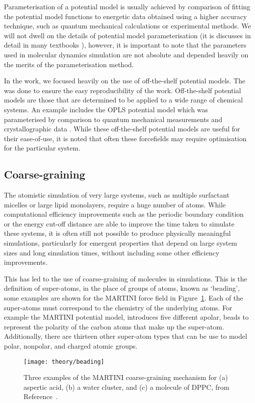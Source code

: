 Parameterisation of a potential model is usually achieved by comparison of fitting the potential model functions to energetic data obtained using a higher accuracy technique, such as quantum mechanical calculations or experimental methods.
We will not dwell on the details of potential model parameterisation (it is discusses in detail in many textbooks \cite{harvey_computational_2018,leach_molecular_1996}), however, it is important to note that the parameters used in molecular dynamics simulation are not absolute and depended heavily on the merits of the parameterisation method.

In the work, we focused heavily on the use of off-the-shelf potential models.
The was done to ensure the easy reproducibility of the work.
Off-the-shelf potential models are those that are determined to be applied to a wide range of chemical systems.
An example includes the OPLS potential model which was parameterised by comparison to quantum mechanical measurements and crystallographic data \cite{jorgensen_opls_1988}.
While these off-the-shelf potential models are useful for their ease-of-use, it is noted that often these forcefields may require optimisation for the particular system.

\subsection{Coarse-graining}
\label{sec:coarsegraining}
The atomistic simulation of very large systems, such as multiple surfactant micelles or large lipid monolayers, require a huge number of atoms.
While computational efficiency improvements such as the periodic boundary condition or the energy cut-off distance are able to improve the time taken to simulate these systems, it is often still not possible to produce physically meaningful simulations, particularly for emergent properties that depend on large system sizes and long simulation times, without including some other efficiency improvements.

This has led to the use of coarse-graining of molecules in simulations.
This is the definition of super-atoms, in the place of groups of atoms, known as `beading', some examples are shown for the MARTINI force field \cite{marrink_martini_2007} in Figure~\ref{fig:cg}.
Each of the super-atoms must correspond to the chemistry of the underlying atoms.
For example the MARTINI potential model, introduces five different apolar, beads to represent the polarity of the carbon atoms that make up the super-atom.
Additionally, there are thirteen other super-atom types that can be use to model polar, nonpolar, and charged atomic groups.
%
\begin{figure}
    \centering
    \texttt{[image: theory/beading]}
    \caption{Three examples of the MARTINI coarse-graining mechanism for (a) aspertic acid, (b) a water cluster, and (c) a molecule of DPPC, from Reference~\cite{pluhackova_biomembranes_2015}.}
    \label{fig:cg}
\end{figure}
%

